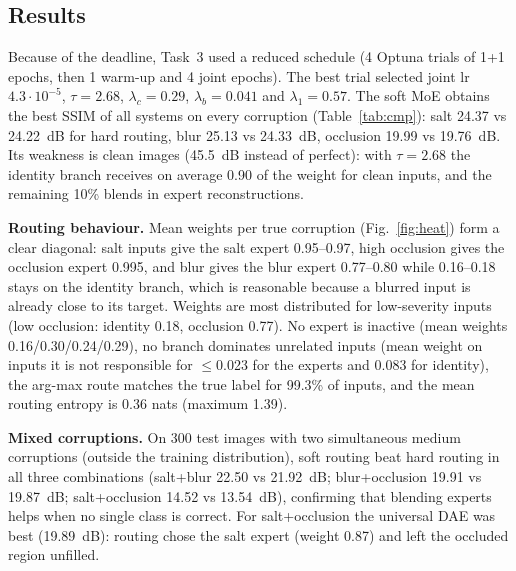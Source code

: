 \documentclass[conference]{IEEEtran}
\begin{document}
\subsection{Results}
Because of the deadline, Task~3 used a reduced schedule (4 Optuna trials of 1+1 epochs, then 1 warm-up and 4 joint epochs). The best trial selected joint lr $4.3\cdot10^{-5}$, $\tau=2.68$, $\lambda_c=0.29$, $\lambda_b=0.041$ and $\lambda_1=0.57$. The soft MoE obtains the best SSIM of all systems on every corruption (Table~\ref{tab:cmp}): salt 24.37 vs 24.22~dB for hard routing, blur 25.13 vs 24.33~dB, occlusion 19.99 vs 19.76~dB. Its weakness is clean images (45.5~dB instead of perfect): with $\tau=2.68$ the identity branch receives on average 0.90 of the weight for clean inputs, and the remaining 10\% blends in expert reconstructions.

\textbf{Routing behaviour.} Mean weights per true corruption (Fig.~\ref{fig:heat}) form a clear diagonal: salt inputs give the salt expert 0.95--0.97, high occlusion gives the occlusion expert 0.995, and blur gives the blur expert 0.77--0.80 while 0.16--0.18 stays on the identity branch, which is reasonable because a blurred input is already close to its target. Weights are most distributed for low-severity inputs (low occlusion: identity 0.18, occlusion 0.77). No expert is inactive (mean weights 0.16/0.30/0.24/0.29), no branch dominates unrelated inputs (mean weight on inputs it is not responsible for $\le$0.023 for the experts and 0.083 for identity), the arg-max route matches the true label for 99.3\% of inputs, and the mean routing entropy is 0.36 nats (maximum 1.39).

\textbf{Mixed corruptions.} On 300 test images with two simultaneous medium corruptions (outside the training distribution), soft routing beat hard routing in all three combinations (salt+blur 22.50 vs 21.92~dB; blur+occlusion 19.91 vs 19.87~dB; salt+occlusion 14.52 vs 13.54~dB), confirming that blending experts helps when no single class is correct. For salt+occlusion the universal DAE was best (19.89~dB): routing chose the salt expert (weight 0.87) and left the occluded region unfilled.
\end{document}
